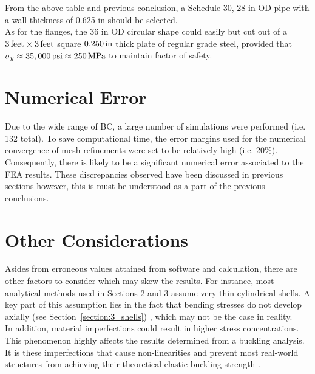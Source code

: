 From the above table and previous conclusion, a Schedule 30, 28 in OD pipe with a wall thickness of 0.625 in should be selected.\\


As for the flanges, the 36 in OD circular shape could easily but cut out of a $3\,\mathrm{feet}\times 3\,\mathrm{feet}$ square $0.250\,\mathrm{in}$ thick plate of regular grade steel, provided that $\sigma_y\approx 35,000 \,\mathrm{psi} \approx 250 \,\mathrm{MPa}$ to maintain factor of safety.


\section{Numerical Error}
\label{subsection:5_numerr}
Due to the wide range of BC, a large number of simulations were performed (i.e. 132 total). To save computational time, the error margins used for the numerical convergence of mesh refinements were set to be relatively high (i.e. 20\%). Consequently, there is likely to be a significant numerical error associated to the FEA results. These discrepancies observed have been discussed in previous sections however, this is must be understood as a part of the previous conclusions.


\section{Other Considerations}
Asides from erroneous values attained from software and calculation, there are other factors to consider which may skew the results. For instance, most analytical methods used in Sections 2 and 3 assume very thin cylindrical shells. A key part of this assumption lies in the fact that bending stresses do not develop axially (see Section~\ref{section:3_shells}) \cite{timoshenko1959theory}, which may not be the case in reality.\\

In addition, material imperfections could result in higher stress concentrations. This phenomenon highly affects the results determined from a buckling analysis. It is these imperfections that cause non-linearities and prevent most real-world structures from achieving their theoretical elastic buckling strength \cite{ANSYS}.

